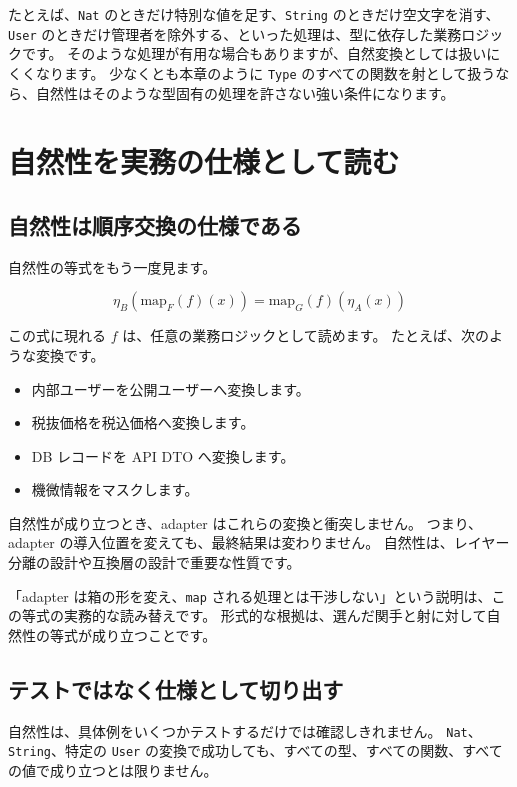 たとえば、\texttt{Nat} のときだけ特別な値を足す、\texttt{String} のときだけ空文字を消す、\texttt{User} のときだけ管理者を除外する、といった処理は、型に依存した業務ロジックです。
そのような処理が有用な場合もありますが、自然変換としては扱いにくくなります。
少なくとも本章のように \texttt{Type} のすべての関数を射として扱うなら、自然性はそのような型固有の処理を許さない強い条件になります。

\section{自然性を実務の仕様として読む}

\subsection{自然性は順序交換の仕様である}

自然性の等式をもう一度見ます。

\[
  \eta_B(\mathrm{map}_F(f)(x))
  =
  \mathrm{map}_G(f)(\eta_A(x))
\]

この式に現れる \(f\) は、任意の業務ロジックとして読めます。
たとえば、次のような変換です。

\begin{itemize}
\item 内部ユーザーを公開ユーザーへ変換します。
\item 税抜価格を税込価格へ変換します。
\item DB レコードを API DTO へ変換します。
\item 機微情報をマスクします。
\end{itemize}

自然性が成り立つとき、adapter はこれらの変換と衝突しません。
つまり、adapter の導入位置を変えても、最終結果は変わりません。
自然性は、レイヤー分離の設計や互換層の設計で重要な性質です。

「adapter は箱の形を変え、\texttt{map} される処理とは干渉しない」という説明は、この等式の実務的な読み替えです。
形式的な根拠は、選んだ関手と射に対して自然性の等式が成り立つことです。

\subsection{テストではなく仕様として切り出す}

自然性は、具体例をいくつかテストするだけでは確認しきれません。
\texttt{Nat}、\texttt{String}、特定の \texttt{User} の変換で成功しても、すべての型、すべての関数、すべての値で成り立つとは限りません。

